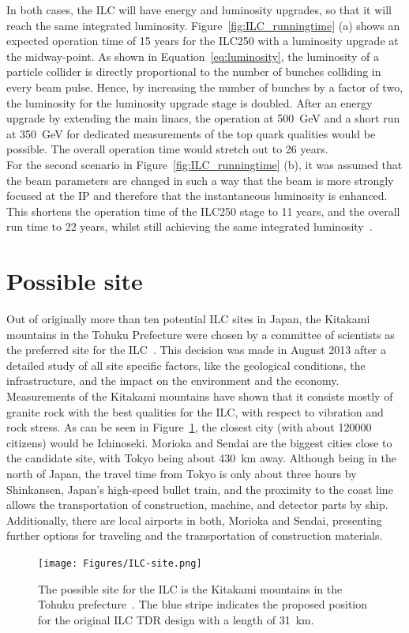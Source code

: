 In both cases, the ILC will have energy and luminosity upgrades, so that it will reach the same integrated luminosity.
Figure~\ref{fig:ILC_runningtime} (a) shows an expected operation time of 15 years for the ILC250 with a luminosity upgrade at the midway-point.
As shown in Equation~\ref{eq:luminosity}, the luminosity of a particle collider is directly proportional to the number of bunches colliding in every beam pulse.
Hence, by increasing the number of bunches by a factor of two, the luminosity for the luminosity upgrade stage is doubled.
After an energy upgrade by extending the main linacs, the operation at \SI{500}{\GeV} and a short run at \SI{350}{\GeV} for dedicated measurements of the top quark qualities would be possible.
The overall operation time would stretch out to 26 years.
\\For the second scenario in Figure~\ref{fig:ILC_runningtime} (b), it was assumed that the beam parameters are changed in such a way that the beam is more strongly focused at the IP and therefore that the instantaneous luminosity is enhanced.
This shortens the operation time of the ILC250 stage to 11 years, and the overall run time to 22 years, whilst still achieving the same integrated luminosity~\cite[p. 7]{PhysicsCase}.


\section{Possible site}
Out of originally more than ten potential ILC sites in Japan, the Kitakami mountains in the Tohuku Prefecture were chosen by a committee of scientists as the preferred site for the ILC~\cite{Site}.
This decision was made in August 2013 after a detailed study of all site specific factors, like the geological conditions, the infrastructure, and the impact on the environment and the economy.
Measurements of the Kitakami mountains have shown that it consists mostly of granite rock with the best qualities for the ILC, with respect to vibration and rock stress.
As can be seen in Figure~\ref{fig:ILC_Site}, the closest city (with about \num{120000} citizens) would be Ichinoseki.
Morioka and Sendai are the biggest cities close to the candidate site, with Tokyo being about \SI{430}{\kilo\meter} away.
Although being in the north of Japan, the travel time from Tokyo is only about three hours by Shinkansen, Japan's high-speed bullet train, and the proximity to the coast line allows the transportation of construction, machine, and detector parts by ship.
Additionally, there are local airports in both, Morioka and Sendai, presenting further options for traveling and the transportation of construction materials.
\label{ILC:site}
\begin{figure}[h]
\centering
\texttt{[image: Figures/ILC-site.png]}
\caption[Possible site for the ILC]{The possible site for the ILC is the Kitakami mountains in the Tohuku prefecture~\cite{Kitakami}.
The blue stripe indicates the proposed position for the original ILC TDR design with a length of \SI{31}{\kilo\meter}.}
\label{fig:ILC_Site}
\end{figure}


